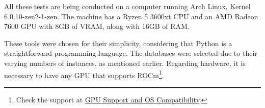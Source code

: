 All these tests are being conducted on a computer running Arch Linux, Kernel 6.0.10-zen2-1-zen. The machine has a Ryzen 5 3600xt CPU and an AMD Radeon 7600 GPU with 8GB of VRAM, along with 16GB of RAM.

These tools were chosen for their simplicity, considering that Python is a straightforward programming language. The databases were selected due to their varying numbers of instances, as mentioned earlier. Regarding hardware, it is necessary to have any GPU that supports ROCm\footnote[2]{Check the support at \href{https://rocm.docs.amd.com/en/latest/release/gpu_os_support.html}{GPU Support and OS Compatibility}.}.

